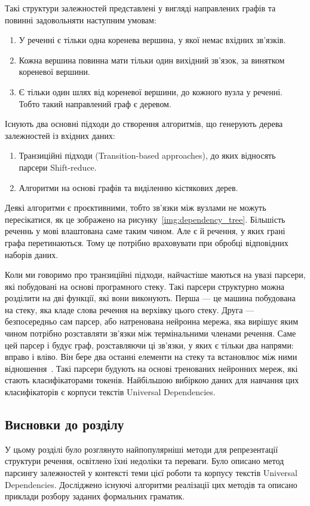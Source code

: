 Такі структури залежностей представлені у вигляді направлених графів та
повинні задовольняти наступним умовам:
\begin{enumerate}
    \item У реченні є тільки одна коренева вершина, у якої немає вхідних зв'язків.
    \item Кожна вершина повинна мати тільки один вихідний зв'язок, за
    винятком кореневої вершини.
    \item Є тільки один шлях від кореневої вершини, до кожного
    вузла у реченні. Тобто такий направлений граф є деревом.
\end{enumerate}

Існують два основні підходи до створення алгоритмів, що генерують дерева
залежностей із вхідних даних:
\begin{enumerate}
    \item Транзиційні підходи (Transition-based approaches), до яких відносять парсери
    Shift-reduce.
    \item Алгоритми на основі графів та виділенню кістякових дерев.
\end{enumerate}

Деякі алгоритми є проєктивними, тобто зв'язки між вузлами не можуть пересікатися, як
це зображено на рисунку~\ref{img:dependency_tree}. Більшість реченнь у мові
влаштована саме таким чином. Але є й речення, у яких грані графа перетинаються. Тому це
потрібно враховувати при обробці відповідних наборів даних.

Коли ми говоримо про транзиційні підходи, найчастіше маються на увазі
парсери, які побудовані на основі програмного стеку. Такі парсери структурно можна
розділити на дві функції, які вони виконують. Перша --- це машина побудована на стеку,
яка кладе слова речення на верхівку цього стеку. Друга --- безпосередньо
сам парсер, або натренована нейронна мережа, яка вирішує яким чином потрібно
розставляти зв'язки між термінальними членами речення. Саме цей парсер і будує
граф, розставляючи ці зв'язки, у яких є тільки два напрями: вправо і вліво.
Він бере два останні елементи на стеку та встановлює між ними відношення~\cite{bib8}.
Такі парсери будують на основі тренованих нейронних мереж, які
стають класифікаторами токенів. Найбільшою вибіркою даних для навчання цих класифікаторів
є корпуси текстів Universal Dependencies.

\subsection*{Висновки до розділу }
У цьому розділі було розглянуто найпопулярніші методи для репрезентації структури
речення, освітлено їхні недоліки та переваги. Було описано метод парсингу
залежностей у контексті теми цієї роботи та корпусу текстів Universal
Dependencies. Досліджено існуючі алгоритми реалізації цих методів та описано
приклади розбору заданих формальних граматик.
